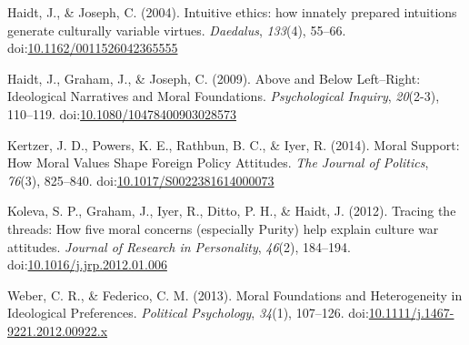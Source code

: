 \documentclass[english,man]{apa6}
\theoremstyle{definition}
\theoremstyle{definition}
\theoremstyle{definition}
\theoremstyle{remark}
\begin{document}
\hypertarget{ref-Haidt2004}{}
Haidt, J., \& Joseph, C. (2004). Intuitive ethics: how innately prepared
intuitions generate culturally variable virtues. \emph{Daedalus},
\emph{133}(4), 55--66.
doi:\href{https://doi.org/10.1162/0011526042365555}{10.1162/0011526042365555}

\hypertarget{ref-Haidt2009}{}
Haidt, J., Graham, J., \& Joseph, C. (2009). Above and Below
Left--Right: Ideological Narratives and Moral Foundations.
\emph{Psychological Inquiry}, \emph{20}(2-3), 110--119.
doi:\href{https://doi.org/10.1080/10478400903028573}{10.1080/10478400903028573}

\hypertarget{ref-Kertzer2014}{}
Kertzer, J. D., Powers, K. E., Rathbun, B. C., \& Iyer, R. (2014). Moral
Support: How Moral Values Shape Foreign Policy Attitudes. \emph{The
Journal of Politics}, \emph{76}(3), 825--840.
doi:\href{https://doi.org/10.1017/S0022381614000073}{10.1017/S0022381614000073}

\hypertarget{ref-Koleva2012}{}
Koleva, S. P., Graham, J., Iyer, R., Ditto, P. H., \& Haidt, J. (2012).
Tracing the threads: How five moral concerns (especially Purity) help
explain culture war attitudes. \emph{Journal of Research in
Personality}, \emph{46}(2), 184--194.
doi:\href{https://doi.org/10.1016/j.jrp.2012.01.006}{10.1016/j.jrp.2012.01.006}

\hypertarget{ref-Weber2013}{}
Weber, C. R., \& Federico, C. M. (2013). Moral Foundations and
Heterogeneity in Ideological Preferences. \emph{Political Psychology},
\emph{34}(1), 107--126.
doi:\href{https://doi.org/10.1111/j.1467-9221.2012.00922.x}{10.1111/j.1467-9221.2012.00922.x}
\end{document}
